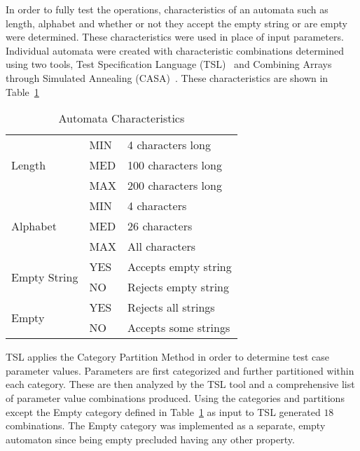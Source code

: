 \documentclass[letterpaper,sigplan]{acmart}
\begin{document}
In order to fully test the operations, characteristics of an automata such as
length, alphabet and whether or not they accept the empty string or are empty
were determined.  These characteristics were used in place of input parameters.
Individual automata were created with characteristic combinations determined
using two tools, Test Specification Language (TSL)~\cite{Ostrand_1988} and
Combining Arrays through Simulated Annealing
(CASA)~\cite{cohen96_combin_desig_approac_to_autom_test_gener}.  These
characteristics are shown in Table~\ref{tab:automata-characteristics}

\begin{table}[ht]
  {\footnotesize
    \begin{tabular}{lll}
      \toprule
      \multirow{3}{*}{Length} & MIN & 4 characters long \\
                              & MED & 100 characters long \\
                              & MAX & 200 characters long \\
      \midrule
      \multirow{3}{*}{Alphabet} & MIN & 4 characters \\
                              & MED & 26 characters \\
                              & MAX & All characters \\
      \midrule
      \multirow{2}{*}{Empty String} & YES & Accepts empty string \\
                              & NO & Rejects empty string \\
      \midrule
      \multirow{2}{*}{Empty} & YES & Rejects all strings \\
                              & NO & Accepts some strings \\
      \bottomrule
    \end{tabular}
  }
  \caption{Automata Characteristics}%
  \label{tab:automata-characteristics}
\end{table}

TSL applies the Category Partition Method in order to determine test case
parameter values.  Parameters are first categorized and further partitioned
within each category.  These are then analyzed by the TSL tool and a
comprehensive list of parameter value combinations produced.  Using the
categories and partitions except the Empty category defined in
Table~\ref{tab:automata-characteristics} as input to TSL generated \(18\)
combinations.  The Empty category was implemented as a separate, empty
automaton since being empty precluded having any other property.
\end{document}
